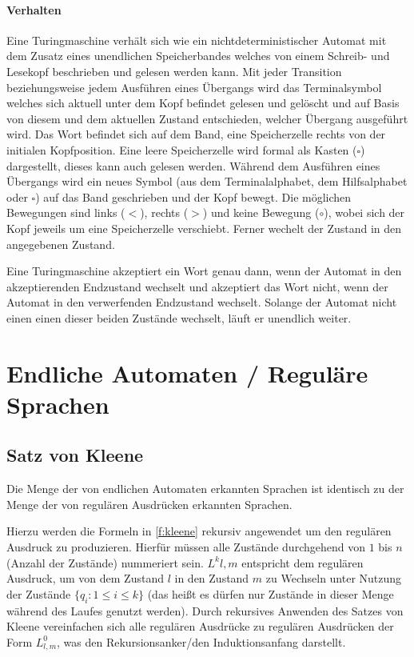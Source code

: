         \paragraph{Verhalten}
            Eine Turingmaschine verhält sich wie ein nichtdeterministischer Automat mit dem Zusatz eines unendlichen Speicherbandes welches von einem Schreib- und Lesekopf beschrieben und gelesen werden kann. Mit jeder Transition beziehungsweise jedem Ausführen eines Übergangs wird das Terminalsymbol welches sich aktuell unter dem Kopf befindet gelesen und gelöscht und auf Basis von diesem und dem aktuellen Zustand entschieden, welcher Übergang ausgeführt wird. Das Wort befindet sich auf dem Band, eine Speicherzelle rechts von der initialen Kopfposition. Eine leere Speicherzelle wird formal als Kasten ($ \square $) dargestellt, dieses kann auch gelesen werden. Während dem Ausführen eines Übergangs wird ein neues Symbol (aus dem Terminalalphabet, dem Hilfsalphabet oder $ \square $) auf das Band geschrieben und der Kopf bewegt. Die möglichen Bewegungen sind links ($ < $), rechts ($ > $) und keine Bewegung ($ \circ $), wobei sich der Kopf jeweils um eine Speicherzelle verschiebt. Ferner wechelt der Zustand in den angegebenen Zustand.

            Eine Turingmaschine akzeptiert ein Wort genau dann, wenn der Automat in den akzeptierenden Endzustand wechselt und akzeptiert das Wort nicht, wenn der Automat in den verwerfenden Endzustand wechselt. Solange der Automat nicht einen einen dieser beiden Zustände wechselt, läuft er unendlich weiter.


\section{Endliche Automaten / Reguläre Sprachen}
    \subsection{Satz von Kleene}
        Die Menge der von endlichen Automaten erkannten Sprachen ist identisch zu der Menge der von regulären Ausdrücken erkannten Sprachen.

        Hierzu werden die Formeln in \ref{f:kleene} rekursiv angewendet um den regulären Ausdruck zu produzieren. Hierfür müssen alle Zustände durchgehend von $ 1 $ bis $ n $ (Anzahl der Zustände) nummeriert sein. $ L ^ k  { l, m } $ entspricht dem regulären Ausdruck, um von dem Zustand $ l $ in den Zustand $ m $ zu Wechseln unter Nutzung der Zustände $ \{ q _ i : 1 \leq i \leq k \} $ (das heißt es dürfen nur Zustände in dieser Menge während des Laufes genutzt werden). Durch rekursives Anwenden des Satzes von Kleene vereinfachen sich alle regulären Ausdrücke zu regulären Ausdrücken der Form $ L ^ 0 _ { l, m } $, was den Rekursionsanker/den Induktionsanfang darstellt.

